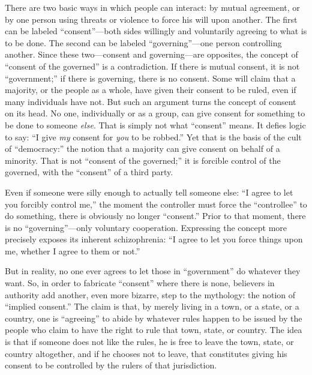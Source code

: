 \documentclass{book}
\begin{document}
There are two basic ways in which people can interact: by mutual agreement, or by one person using threats or violence to force his will upon another. The first can be labeled \enquote{consent}---both sides willingly and voluntarily agreeing to what is to be done. The second can be labeled \enquote{governing}---one person controlling another. Since these two---consent and governing---are opposites, the concept of \enquote{consent of the governed} is a contradiction. If there is mutual consent, it is not \enquote{government;} if there is governing, there is no consent. Some will claim that a majority, or the people as a whole, have given their consent to be ruled, even if many individuals have not. But such an argument turns the concept of consent on its head. No one, individually or as a group, can give consent for something to be done to someone \emph{else}. That is simply not what \enquote{consent} means. It defies logic to say: \enquote{I give \emph{my} consent for \emph{you} to be robbed.} Yet that is the basis of the cult of \enquote{democracy:} the notion that a majority can give consent on behalf of a minority. That is not \enquote{consent of the governed;} it is forcible control of the governed, with the \enquote{consent} of a third party.

Even if someone were silly enough to actually tell someone else: \enquote{I agree to let you forcibly control me,} the moment the controller must force the \enquote{controllee} to do something, there is obviously no longer \enquote{consent.} Prior to that moment, there is no \enquote{governing}---only voluntary cooperation. Expressing the concept more precisely exposes its inherent schizophrenia: \enquote{I agree to let you force things upon me, whether I agree to them or not.}

But in reality, no one ever agrees to let those in \enquote{government} do whatever they want. So, in order to fabricate \enquote{consent} where there is none, believers in authority add another, even more bizarre, step to the mythology: the notion of \enquote{implied consent.} The claim is that, by merely living in a town, or a state, or a country, one is \enquote{agreeing} to abide by whatever rules happen to be issued by the people who claim to have the right to rule that town, state, or country. The idea is that if someone does not like the rules, he is free to leave the town, state, or country altogether, and if he chooses not to leave, that constitutes giving his consent to be controlled by the rulers of that jurisdiction.
\end{document}
